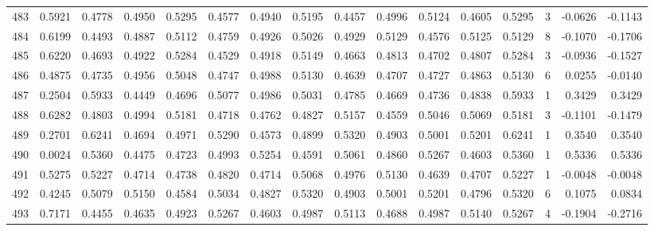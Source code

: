\begin{tabular}{lrrrrrrrrrrrrrrr}
483 &      0.5921 &  0.4778 &  0.4950 &  0.5295 &  0.4577 &  0.4940 &  0.5195 &  0.4457 &  0.4996 &  0.5124 &   0.4605 &     0.5295 &      3 &                   -0.0626 &                    -0.1143 \\
484 &      0.6199 &  0.4493 &  0.4887 &  0.5112 &  0.4759 &  0.4926 &  0.5026 &  0.4929 &  0.5129 &  0.4576 &   0.5125 &     0.5129 &      8 &                   -0.1070 &                    -0.1706 \\
485 &      0.6220 &  0.4693 &  0.4922 &  0.5284 &  0.4529 &  0.4918 &  0.5149 &  0.4663 &  0.4813 &  0.4702 &   0.4807 &     0.5284 &      3 &                   -0.0936 &                    -0.1527 \\
486 &      0.4875 &  0.4735 &  0.4956 &  0.5048 &  0.4747 &  0.4988 &  0.5130 &  0.4639 &  0.4707 &  0.4727 &   0.4863 &     0.5130 &      6 &                    0.0255 &                    -0.0140 \\
487 &      0.2504 &  0.5933 &  0.4449 &  0.4696 &  0.5077 &  0.4986 &  0.5031 &  0.4785 &  0.4669 &  0.4736 &   0.4838 &     0.5933 &      1 &                    0.3429 &                     0.3429 \\
488 &      0.6282 &  0.4803 &  0.4994 &  0.5181 &  0.4718 &  0.4762 &  0.4827 &  0.5157 &  0.4559 &  0.5046 &   0.5069 &     0.5181 &      3 &                   -0.1101 &                    -0.1479 \\
489 &      0.2701 &  0.6241 &  0.4694 &  0.4971 &  0.5290 &  0.4573 &  0.4899 &  0.5320 &  0.4903 &  0.5001 &   0.5201 &     0.6241 &      1 &                    0.3540 &                     0.3540 \\
490 &      0.0024 &  0.5360 &  0.4475 &  0.4723 &  0.4993 &  0.5254 &  0.4591 &  0.5061 &  0.4860 &  0.5267 &   0.4603 &     0.5360 &      1 &                    0.5336 &                     0.5336 \\
491 &      0.5275 &  0.5227 &  0.4714 &  0.4738 &  0.4820 &  0.4714 &  0.5068 &  0.4976 &  0.5130 &  0.4639 &   0.4707 &     0.5227 &      1 &                   -0.0048 &                    -0.0048 \\
492 &      0.4245 &  0.5079 &  0.5150 &  0.4584 &  0.5034 &  0.4827 &  0.5320 &  0.4903 &  0.5001 &  0.5201 &   0.4796 &     0.5320 &      6 &                    0.1075 &                     0.0834 \\
493 &      0.7171 &  0.4455 &  0.4635 &  0.4923 &  0.5267 &  0.4603 &  0.4987 &  0.5113 &  0.4688 &  0.4987 &   0.5140 &     0.5267 &      4 &                   -0.1904 &                    -0.2716 \\

\end{tabular}
